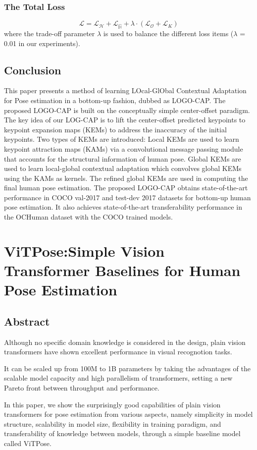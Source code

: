 \documentclass[11pt]{article}
\begin{document}
\subsubsection{The Total Loss}
$$\mathcal{L} = \mathcal{L}_{\mathcal{H}} + \mathcal{L}_{\hat{\mathbb{H}}} + \lambda\cdot (\mathcal{L}_\mathcal{O}+\mathcal{L}_K)$$
where the trade-off parameter $\lambda$ is used to balance the different loss items ($\lambda$ = 0.01 in our experiments).
\subsection{Conclusion}
This paper presents a method of learning LOcal-GlObal Contextual Adaptation for Pose estimation in a bottom-up fashion, dubbed as LOGO-CAP. The proposed LOGO-CAP is built on the conceptually simple center-offset paradigm. The key idea of our LOG-CAP is to lift the center-offset predicted keypoints to keypoint expansion maps (KEMs) to address the inaccuracy of the initial keypoints. Two types of KEMs are introduced: Local KEMs are used to learn keypoint attraction maps (KAMs) via a convolutional message passing module that accounts for the structural information of human pose. Global KEMs are used to learn local-global contextual adaptation which convolves global KEMs using the KAMs as kernels. The refined global KEMs are used in computing the final human pose estimation. The proposed LOGO-CAP obtains state-of-the-art performance in COCO val-2017 and test-dev 2017 datasets for bottom-up human pose estimation. It also achieves state-of-the-art transferability performance in the OCHuman dataset with the COCO trained models.
\section{ViTPose:Simple Vision Transformer Baselines for Human Pose Estimation}
\subsection{Abstract}
Although no specific domain knowledge is considered in the design, plain vision transformers have shown excellent performance in visual recognotion tasks.

It can be scaled up from 100M to 1B parameters by taking the advantages of the scalable model capacity and high parallelism of transformers, setting a new Pareto front between throughput and performance.

In this paper, we show the surprisingly good capabilities of plain vision transformers for pose estimation from various aspects, namely simplicity in model structure, scalability in model size, flexibility in training paradigm, and transferability of knowledge between models, through a simple baseline model called ViTPose.
\end{document}
